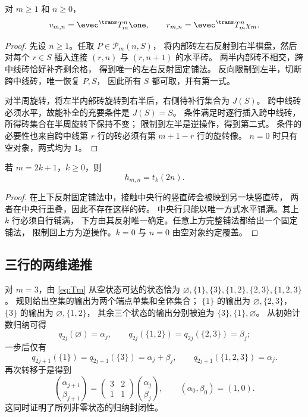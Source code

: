 \begin{lemma}[中线补全双射]\label{lem:half}
对 $m\ge1$ 和 $n\ge0$，
\begin{equation}\label{eq:half-fixed}
 v_{m,n}=\evec^{\trans}T_m^n\one,\qquad
 r_{m,n}=\evec^{\trans}T_m^n\chi_m.
\end{equation}
\end{lemma}
\begin{proof}
先设 $n\ge1$。任取 $P\in\mathcal P_m(n,S)$，
将内部砖左右反射到右半棋盘，然后对每个 $r\in S$
插入连接 $(r,n)$ 与 $(r,n+1)$ 的水平砖。
两半内部砖不相交，跨中线砖恰好补齐剩余格，
得到唯一的左右反射固定铺法。
反向限制到左半，切断跨中线砖，唯一恢复 $P,S$，
因此所有 $S$ 都可取，并有第一式。

对半周旋转，将左半内部砖旋转到右半后，右侧待补行集合为 $J(S)$。
跨中线砖必须水平，故能补全的充要条件是 $J(S)=S$。
条件满足时逐行插入跨中线砖，所得砖集合在半周旋转下保持不变；
限制到左半是逆操作，得到第二式。
条件的必要性也来自跨中线第 $r$ 行的砖必须有第 $m+1-r$ 行的旋转像。
$n=0$ 时只有空对象，两式均为 1。
\end{proof}

\begin{lemma}[奇数高度的上下反射]\label{lem:h-odd}
若 $m=2k+1$，$k\ge0$，则
\begin{equation}\label{eq:h-odd}
 h_{m,n}=t_k(2n).
\end{equation}
\end{lemma}
\begin{proof}
在上下反射固定铺法中，接触中央行的竖直砖会被映到另一块竖直砖，
两者在中央行重叠，因此不存在这样的砖。
中央行只能以唯一方式水平铺满。其上 $k$ 行必须自行铺满，
下方由其反射唯一确定。任意上方完整铺法都给出一个固定铺法，
限制回上方为逆操作。$k=0$ 与 $n=0$ 由空对象约定覆盖。
\end{proof}

\subsection{三行的两维递推}
对 $m=3$，由 \eqref{eq:Tm} 从空状态可达的状态恰为
$\varnothing,\{1\},\{3\},\{1,2\},\{2,3\},\{1,2,3\}$。
规则给出空集的输出为两个端点单集和全体集合；
$\{1\}$ 的输出为 $\varnothing,\{2,3\}$，
$\{3\}$ 的输出为 $\varnothing,\{1,2\}$，
其余三个状态的输出分别被迫为 $\{3\},\{1\},\varnothing$。
从初始计数归纳可得
\[
 q_{2j}(\varnothing)=\alpha_j,\qquad
 q_{2j}(\{1,2\})=q_{2j}(\{2,3\})=\beta_j;
\]
一步后仅有
\[
 q_{2j+1}(\{1\})=q_{2j+1}(\{3\})=\alpha_j+\beta_j,\qquad
 q_{2j+1}(\{1,2,3\})=\alpha_j.
\]
再次转移于是得到
\begin{equation}\label{eq:two-dimensional}
 \binom{\alpha_{j+1}}{\beta_{j+1}}
 =\begin{pmatrix}3&2\\1&1\end{pmatrix}
 \binom{\alpha_j}{\beta_j},\qquad
 (\alpha_0,\beta_0)=(1,0).
\end{equation}
这同时证明了所列非零状态的归纳封闭性。

